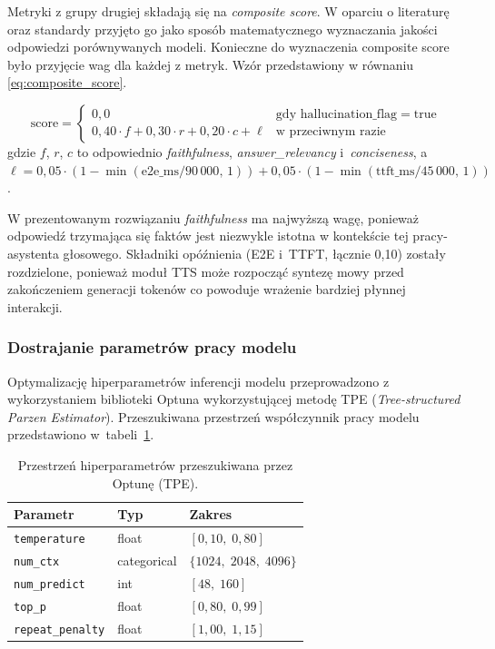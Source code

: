 Metryki z grupy drugiej składają się na \emph{composite score}. W oparciu o literaturę oraz standardy \cite{Es2024Ragas,ConCISE2025,DefAn2024} przyjęto go jako sposób matematycznego wyznaczania jakości odpowiedzi porównywanych modeli. Konieczne 
do wyznaczenia composite score było przyjęcie wag dla każdej z metryk. Wzór przedstawiony w równaniu \ref{eq:composite_score}.

\begin{equation}
  \label{eq:composite_score}
  \mathrm{score} =
  \begin{cases}
    0{,}0 & \text{gdy } \mathrm{hallucination\_flag} = \mathrm{true} \\[6pt]
    0{,}40 \cdot f + 0{,}30 \cdot r + 0{,}20 \cdot c + \ell & \text{w~przeciwnym razie}
  \end{cases}
\end{equation}
\noindent
gdzie $f$, $r$, $c$ to odpowiednio \emph{faithfulness}, \emph{answer\_relevancy}
i~\emph{conciseness}, a~$\ell = 0{,}05 \cdot (1 - \min(\mathrm{e2e\_ms}/90\,000,\, 1))
+ 0{,}05 \cdot (1 - \min(\mathrm{ttft\_ms}/45\,000,\, 1))$.

W prezentowanym rozwiązaniu \emph{faithfulness} ma najwyższą wagę, ponieważ odpowiedź trzymająca się faktów jest niezwykle istotna w kontekście tej pracy- asystenta głosowego. Składniki opóźnienia (E2E
i~TTFT, łącznie 0{,}10) zostały rozdzielone, ponieważ moduł TTS może rozpocząć
syntezę mowy przed zakończeniem generacji tokenów co powoduje wrażenie bardziej płynnej interakcji. 

\subsubsection{Dostrajanie parametrów pracy modelu}

Optymalizację hiperparametrów inferencji modelu przeprowadzono z wykorzystaniem biblioteki Optuna
wykorzystującej metodę TPE (\emph{Tree-structured Parzen Estimator}). Przeszukiwana
przestrzeń współczynnik pracy modelu przedstawiono w~tabeli~\ref{tab:optuna_hparams}.

\begin{table}[H]
  \centering
  \caption{Przestrzeń hiperparametrów przeszukiwana przez Optunę (TPE).}
  \label{tab:optuna_hparams}
  \begin{tabular}{lll}
    \hline
    Parametr & Typ & Zakres \\
    \hline
    \texttt{temperature}    & float       & $[0{,}10,\; 0{,}80]$ \\
    \texttt{num\_ctx}       & categorical & $\{1024,\; 2048,\; 4096\}$ \\
    \texttt{num\_predict}   & int         & $[48,\; 160]$ \\
    \texttt{top\_p}         & float       & $[0{,}80,\; 0{,}99]$ \\
    \texttt{repeat\_penalty}& float       & $[1{,}00,\; 1{,}15]$ \\
    \hline
  \end{tabular}
\end{table}

